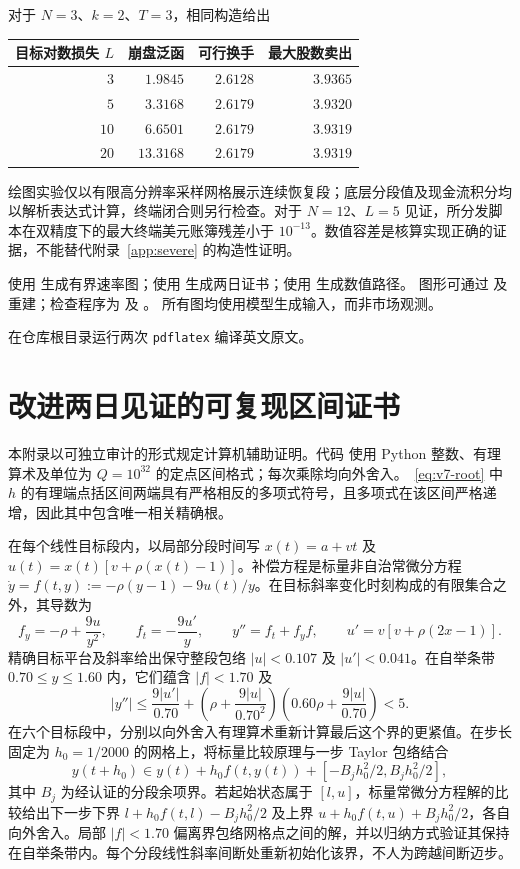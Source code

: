\documentclass[11pt]{article}
\numberwithin{equation}{section}
\theoremstyle{definition}
\theoremstyle{remark}
\begin{document}
对于 $N=3$、$k=2$、$T=3$，相同构造给出
\begin{center}\small
\begin{tabular}{@{}rrrr@{}}\toprule
目标对数损失 $L$ & 崩盘泛函 & 可行换手 & 最大股数卖出\\\midrule
$3$ & $1.9845$ & $2.6128$ & $3.9365$\\
 $5$ & $3.3168$ & $2.6179$ & $3.9320$\\
$10$ & $6.6501$ & $2.6179$ & $3.9319$\\
$20$ & $13.3168$ & $2.6179$ & $3.9319$\\
\bottomrule\end{tabular}
\end{center}
绘图实验仅以有限高分辨率采样网格展示连续恢复段；底层分段值及现金流积分均以解析表达式计算，终端闭合则另行检查。对于 $N=12$、$L=5$ 见证，所分发脚本在双精度下的最大终端美元账簿残差小于 $10^{-13}$。数值容差是核算实现正确的证据，不能替代附录~\ref{app:severe} 的构造性证明。

\begingroup\sloppy
使用  生成有界速率图；使用  生成两日证书；使用  生成数值路径。
图形可通过  及  重建；检查程序为  及 。
所有图均使用模型生成输入，而非市场观测。\par\endgroup
在仓库根目录运行两次 \texttt{pdflatex} 编译英文原文。


\section{改进两日见证的可复现区间证书}\label{app:v7certificate}
本附录以可独立审计的形式规定计算机辅助证明。代码  使用 Python 整数、有理算术及单位为 $Q=10^{32}$ 的定点区间格式；每次乘除均向外舍入。~\eqref{eq:v7-root} 中 $h$ 的有理端点括区间两端具有严格相反的多项式符号，且多项式在该区间严格递增，因此其中包含唯一相关精确根。

在每个线性目标段内，以局部分段时间写 $x(t)=a+vt$ 及 $u(t)=x(t)[v+\rho(x(t)-1)]$。补偿方程是标量非自治常微分方程 $\dot y=f(t,y):=-\rho(y-1)-9u(t)/y$。在目标斜率变化时刻构成的有限集合之外，其导数为
\[
f_y=-\rho+\frac{9u}{y^2},\qquad f_t=-\frac{9u'}y,\qquad
 y''=f_t+f_y f,\qquad u'=v[v+\rho(2x-1)].
\]
精确目标平台及斜率给出保守整段包络 $|u|<0.107$ 及 $|u'|<0.041$。在自举条带 $0.70\le y\le1.60$ 内，它们蕴含 $|f|<1.70$ 及
\[
|y''|\le\frac{9|u'|}{0.70}
+\left(\rho+\frac{9|u|}{0.70^2}\right)
\left(0.60\rho+\frac{9|u|}{0.70}\right)<5.
\]
在六个目标段中，分别以向外舍入有理算术重新计算最后这个界的更紧值。在步长固定为 $h_0=1/2000$ 的网格上，将标量比较原理与一步 Taylor 包络结合
\[
 y(t+h_0)\in y(t)+h_0 f(t,y(t))+[-B_j h_0^2/2,B_j h_0^2/2],
\]
其中 $B_j$ 为经认证的分段余项界。若起始状态属于 $[l,u]$，标量常微分方程解的比较给出下一步下界 $l+h_0 f(t,l)-B_jh_0^2/2$ 及上界 $u+h_0 f(t,u)+B_jh_0^2/2$，各自向外舍入。局部 $|f|<1.70$ 偏离界包络网格点之间的解，并以归纳方式验证其保持在自举条带内。每个分段线性斜率间断处重新初始化该界，不人为跨越间断迈步。
\end{document}
